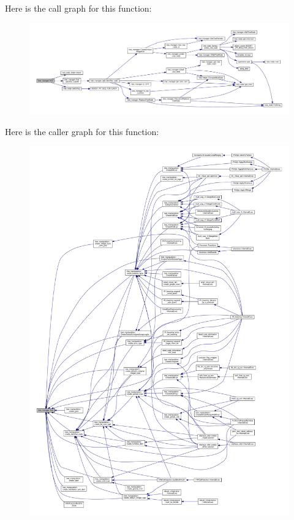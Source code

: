 Here is the call graph for this function\+:
\nopagebreak
\begin{figure}[H]
\begin{center}
\leavevmode
\includegraphics[width=350pt]{d2/ddd/classtree__manager_aeb1203c36b76b27e3b322d4a8cfc55d8_cgraph}
\end{center}
\end{figure}
Here is the caller graph for this function\+:
\nopagebreak
\begin{figure}[H]
\begin{center}
\leavevmode
\includegraphics[width=350pt]{d2/ddd/classtree__manager_aeb1203c36b76b27e3b322d4a8cfc55d8_icgraph}
\end{center}
\end{figure}
\mbox{\label{classtree__manager_a9b84caccb4095fc91cbf434b0deb25a8}} 
